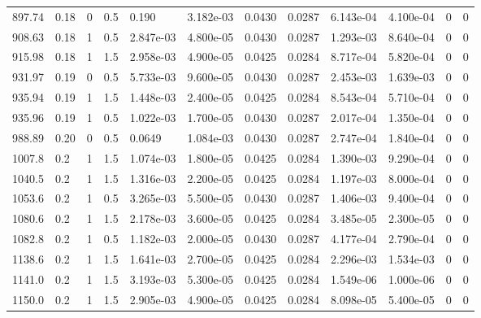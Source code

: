 \documentclass[preview]{standalone}
\begin{document}
{{\begin{tabular}{L{1.2cm}C{1.2cm} C{0.3cm}C{0.5cm} C{1.4cm}C{1.4cm} C{1.4cm}C{1.4cm} C{1.6cm}C{1.6cm} C{1.6cm}C{1.6cm}}
  897.74  &  0.18  & 0     & 0.5 &  0.190  & 3.182e-03  &  0.0430&   0.0287& 6.143e-04 & 4.100e-04   &  0 & 0  \\ 
  908.63  &  0.18  & 1     & 0.5 &  2.847e-03  & 4.800e-05  &  0.0430&   0.0287& 1.293e-03 & 8.640e-04   &  0 & 0  \\ 
  915.98  &  0.18  & 1     & 1.5 &  2.958e-03  & 4.900e-05  &  0.0425&   0.0284& 8.717e-04 & 5.820e-04   &  0 & 0  \\ 
  931.97  &  0.19  & 0     & 0.5 &  5.733e-03  & 9.600e-05  &  0.0430&   0.0287& 2.453e-03 & 1.639e-03   &  0 & 0  \\ 
  935.94  &  0.19  & 1     & 1.5 &  1.448e-03  & 2.400e-05  &  0.0425&   0.0284& 8.543e-04 & 5.710e-04   &  0 & 0  \\ 
  935.96  &  0.19  & 1     & 0.5 &  1.022e-03  & 1.700e-05  &  0.0430&   0.0287& 2.017e-04 & 1.350e-04   &  0 & 0  \\ 
  988.89  &  0.20  & 0     & 0.5 &  0.0649  & 1.084e-03  &  0.0430&   0.0287& 2.747e-04 & 1.840e-04   &  0 & 0  \\ 
  1007.8  &   0.2  & 1     & 1.5 &  1.074e-03  & 1.800e-05  &  0.0425&   0.0284& 1.390e-03 & 9.290e-04   &  0 & 0  \\ 
  1040.5  &   0.2  & 1     & 1.5 &  1.316e-03  & 2.200e-05  &  0.0425&   0.0284& 1.197e-03 & 8.000e-04   &  0 & 0  \\ 
  1053.6  &   0.2  & 1     & 0.5 &  3.265e-03  & 5.500e-05  &  0.0430&   0.0287& 1.406e-03 & 9.400e-04   &  0 & 0  \\ 
  1080.6  &   0.2  & 1     & 1.5 &  2.178e-03  & 3.600e-05  &  0.0425&   0.0284& 3.485e-05 & 2.300e-05   &  0 & 0  \\ 
  1082.8  &   0.2  & 1     & 0.5 &  1.182e-03  & 2.000e-05  &  0.0430&   0.0287& 4.177e-04 & 2.790e-04   &  0 & 0  \\ 
  1138.6  &   0.2  & 1     & 1.5 &  1.641e-03  & 2.700e-05  &  0.0425&   0.0284& 2.296e-03 & 1.534e-03   &  0 & 0  \\ 
  1141.0  &   0.2  & 1     & 1.5 &  3.193e-03  & 5.300e-05  &  0.0425&   0.0284& 1.549e-06 & 1.000e-06   &  0 & 0  \\ 
  1150.0  &   0.2  & 1     & 1.5 &  2.905e-03  & 4.900e-05  &  0.0425&   0.0284& 8.098e-05 & 5.400e-05   &  0 & 0  \\ 
\hline 
\end{tabular} 

}}
\end{document}
